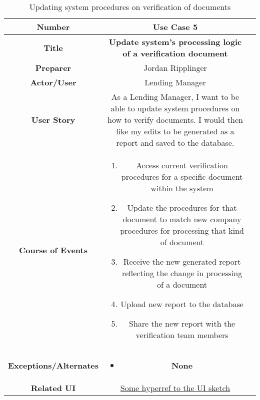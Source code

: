 \begin{table}[H]
    \centering
    \begin{tabularx}{0.75\linewidth}{||Sc|X||}
        \hline
        \hline
        \textbf{Number} & \textbf{Use Case 5} \\
        \hline
        \textbf{Title} & \textbf{Update system's processing logic of a verification document} \\
        \hline
        \textbf{Preparer} & Jordan Ripplinger \\
        \hline
        \textbf{Actor/User} & Lending Manager \\
        \hline
        \textbf{User Story} &
        As a Lending Manager, I want to be able to update system procedures on how to verify documents. I would then like my edits to be generated as a report and saved to the database. \\
        \hline
        \textbf{Course of Events} &
        \begin{minipage}[l]{\linewidth}
            \begin{enumerate}[wide, labelindent=0pt]
                \item Access current verification procedures for a specific document within the system
                \item Update the procedures for that document to match new company procedures for processing that kind of document
                \item Receive the new generated report reflecting the change in processing of a document
                \item Upload new report to the database
                \item Share the new report with the verification team members
            \end{enumerate}
            \vspace{4pt}
        \end{minipage} \\
        \hline
        \textbf{Exceptions/Alternates} & 
        \begin{minipage}[l]{\linewidth}
            \vspace{2pt}
            \begin{itemize}[wide, labelindent=0pt]
                \item \textbf{None}
            \end{itemize}
        \end{minipage} \\
        \hline
        \textbf{Related UI} & \hyperref[templatesec]{Some hyperref to the UI sketch} \\
        \hline
        \hline
    \end{tabularx}
    \caption{Updating system procedures on verification of documents}
    \label{tab:use_case_update_sys_procedures}
\end{table}


